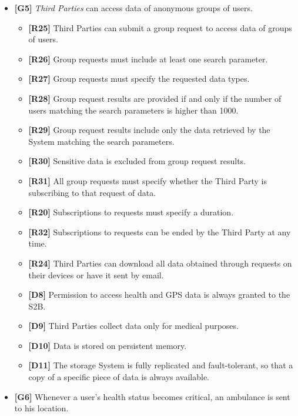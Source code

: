 \documentclass[titlepage]{article}
\begin{document}
\begin{itemize}
   				 \item {\bf [G5]} {\it Third Parties} can access data of anonymous groups of users.
				  \begin{itemize} %
					 	\item {\bf [R25]} Third Parties can submit a group request to access data of groups of users. 
\item {\bf [R26]}  Group requests must include at least one search parameter. 
\item {\bf [R27]}  Group requests must specify the requested data types. 
\item {\bf [R28]}  Group request results are provided if and only if the number of users matching the search parameters is higher than 1000. 
\item {\bf [R29]} Group request results include only the data retrieved by the System matching the search parameters. 
\item {\bf [R30]} Sensitive data is excluded from group request results. 
\item {\bf [R31]} All group requests must specify whether the Third Party is subscribing to that request of data. 
\item {\bf [R20]} Subscriptions to requests must specify a duration.
\item {\bf [R32]}  Subscriptions to requests can be ended by the Third Party at any time.
\item {\bf [R24]}  Third Parties can download all data obtained through requests on their devices or have it sent by email.
\item {\bf [D8]}  Permission to access health and GPS data is always granted to the S2B.
\item {\bf [D9]} Third Parties collect data only for medical purposes.
\item {\bf [D10]} Data is stored on persistent memory. 
\item {\bf [D11]}  The storage System is fully replicated and fault-tolerant, so that a copy of a specific piece of data is always available.
									
					\end{itemize}

   				 \item {\bf [G6]} Whenever a user’s health status becomes critical, an ambulance is sent to his location.
				 

\end{itemize}
\end{document}
